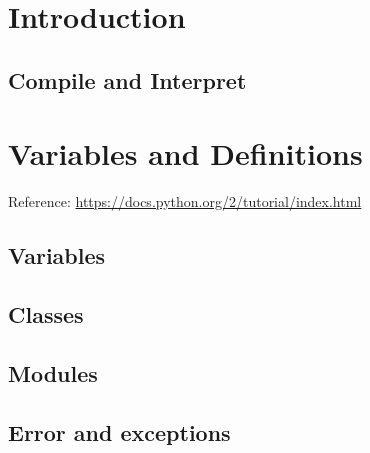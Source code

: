 \documentclass[fleqn,10pt]{SelfArx} %
\begin{document}
	
	\flushbottom %
	
	\maketitle %
	
	\tableofcontents %
	
	\thispagestyle{empty} %
	
	
	\section{Introduction} 
	
	\subsection{Compile and Interpret}
		
	
	\section{Variables and Definitions} 
	Reference: \url{https://docs.python.org/2/tutorial/index.html}
	
	\subsection{Variables}
	
	\subsection{Classes}
	
	\subsection{Modules}
	
	\subsection{Error and exceptions}
	
	
\end{document}
